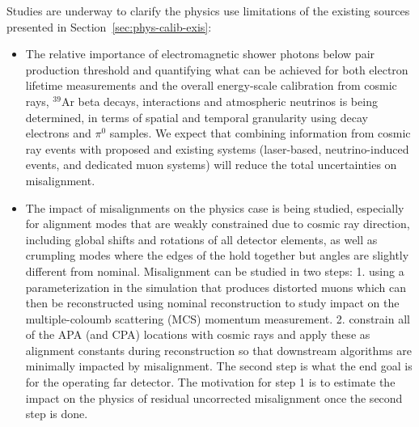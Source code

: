 Studies are underway to clarify the physics use limitations of the existing sources presented in Section~\ref{sec:phys-calib-exis}:
\begin{itemize}
\item The relative importance of electromagnetic shower photons below pair production threshold and quantifying what can be achieved for both electron lifetime measurements and the overall energy-scale calibration from cosmic rays, ${}^{39}$Ar beta decays,  interactions and atmospheric neutrinos is being determined, in terms of spatial and temporal granularity using decay electrons and $\pi^0$ samples. We expect that combining information from cosmic ray events with proposed and existing systems (laser-based, neutrino-induced events, and dedicated muon systems) will reduce the total uncertainties on misalignment.  

\item The impact of misalignments on the physics case is being studied, especially for alignment modes that are weakly constrained due to cosmic ray direction, including global shifts and rotations of all detector elements, as well as crumpling modes where the edges of the  hold together but angles are slightly different from nominal. Misalignment can be studied in two steps: 1. using a parameterization in the simulation that produces distorted muons which can then be reconstructed using nominal reconstruction to study impact on the multiple-coloumb scattering (MCS) momentum measurement. 2. constrain all of the APA (and CPA) locations with cosmic rays and apply these as alignment constants during reconstruction so that downstream algorithms are minimally impacted by misalignment. The second step is what the end goal is for the operating far detector. The motivation for step 1 is to estimate the impact on the physics of residual uncorrected misalignment once the second step is done.



\end{itemize}
